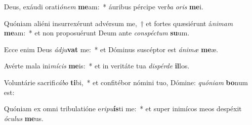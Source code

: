 \item Deus, exáudi orati\textit{ó}\textit{nem} \textbf{me}am:~* áuribus pércipe ver\textit{ba} \textit{o}\textit{ris} \textbf{me}i.
\item Quóniam aliéni insurrexérunt advérsum me,~† et fortes quæsiérunt á\textit{ni}\textit{mam} \textbf{me}am:~* et non proposuérunt Deum ante \textit{con}\textit{spéc}\textit{tum} \textbf{su}um.
\item Ecce enim Deus \textit{ád}\textit{ju}\textbf{vat} me:~* et Dóminus suscéptor est \textit{á}\textit{ni}\textit{mæ} \textbf{me}æ.
\item Avérte mala ini\textit{mí}\textit{cis} \textbf{me}is:~* et in veritáte tua \textit{dis}\textit{pér}\textit{de} \textbf{il}los.
\item Voluntárie sacrifi\textit{cá}\textit{bo} \textbf{ti}bi,~* et confitébor nómini tuo, Dómine: \textit{quón}\textit{i}\textit{am} \textbf{bo}num est:
\item Quóniam ex omni tribulatióne e\textit{ri}\textit{pu}\textbf{ís}ti me:~* et super inimícos meos despéxit \textit{ó}\textit{cu}\textit{lus} \textbf{me}us.
